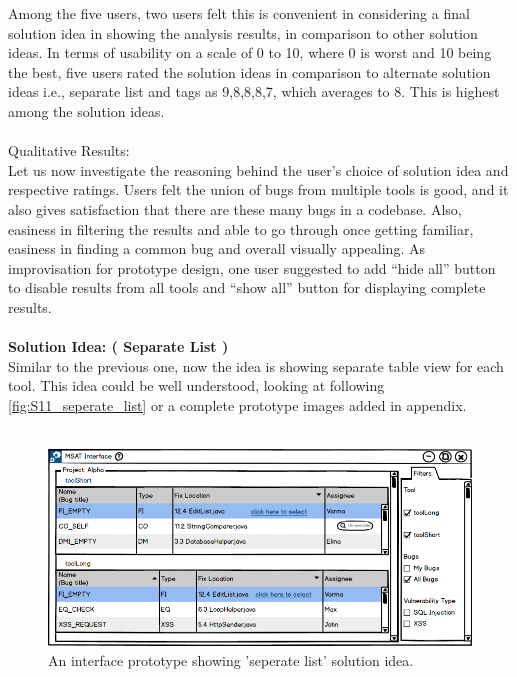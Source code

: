 Among the five users, two users felt this is convenient in considering a final solution idea in showing the analysis results, in comparison to other solution ideas.  In terms of usability on a scale of 0 to 10, where 0 is worst and 10 being the best, five users rated the solution ideas in comparison to alternate solution ideas i.e., separate list and tags as 9,8,8,8,7, which averages to 8. This is highest among the solution ideas. \\ \\

Qualitative Results: \\

Let us now investigate the reasoning behind the user’s choice of solution idea and respective ratings. Users felt the union of bugs from multiple tools is good, and it also gives satisfaction that there are these many bugs in a codebase. Also, easiness in filtering the results and able to go through once getting familiar, easiness in finding a common bug and overall visually appealing. As improvisation for prototype design, one user suggested to add “hide all” button to disable results from all tools and “show all” button for displaying complete results. \\ \\


\textbf{Solution Idea: ( Separate List )} \\

Similar to the previous one, now the idea is showing separate table view for each tool. This idea could be well understood, looking at following \autoref{fig:S11_seperate_list} or a complete prototype images added in appendix. \\ \\


\begin{figure}[hbt!]
	\centering
	\includegraphics[width=\linewidth]{figures/solution_ideas_snaps/S11_seperate_list}
	\caption{An interface prototype showing 'seperate list' solution idea.}
	\label{fig:S11_seperate_list}
\end{figure}

